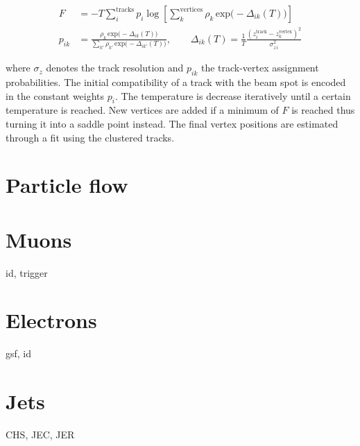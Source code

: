\begin{align}
F&=-T\sum_{i}^\mathrm{tracks}p_{i}\log\left[\sum_{k}^\mathrm{vertices}\rho_{k}\,\mathrm{exp}\big(-\Delta_{ik}(T)\big)\right]\\
p_{ik}&=\frac{\rho_{k}\,\mathrm{exp}\big(-\Delta_{ik}(T)\big)}{\sum_{k\prime}\rho_{k\prime}\,\mathrm{exp}\big(-\Delta_{ik\prime}(T)\big)},\qquad\Delta_{ik}(T)=\frac{1}{T}\frac{(z_{i}^\mathrm{track}-z_{k}^\mathrm{vertex})^2}{\sigma_{z\,i}^{2}}
\end{align}

where $\sigma_{z}$ denotes the track resolution and $p_{ik}$ the track-vertex assignment probabilities. The initial compatibility of a track with the beam spot is encoded in the constant weights $p_{i}$. The temperature is decrease iteratively until a certain temperature is reached. New vertices are added if a minimum of $F$ is reached thus turning it into a saddle point instead. The final vertex positions are estimated through a fit using the clustered tracks.




\section{Particle flow}

\section{Muons}

id, trigger

\section{Electrons}
\label{sec:reconstruction-electrons}

gsf, id

\section{Jets}

CHS, JEC, JER

